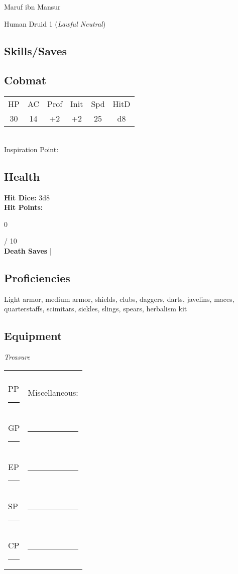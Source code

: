 \documentclass[letterpaper,10pt,twoside,twocolumn,openany]{book}
\begin{document}
{\LARGE{Maruf ibn Mansur}}

Human Druid 1 (\textit{Lawful Neutral})

\subsection{Skills/Saves}
\saves[
    STR=\stat{9},
    DEX=\stat{16},
    CON=\stat{10},
    INT=\stat{10},
    WIS=\stat{16},
    CHA=\stat{15},
]

\subsection{Cobmat}
\begin{tabular}{cccccc}
  HP & AC & Prof & Init & Spd & HitD \\
  30 & 14 & +2   & +2   & 25  & d8   \\
\end{tabular}\\[2pt]
Inspiration Point: \Circle

\subsection{Health}
\begingroup
  \unskip\color{titlered}
  \textbf{Hit Dice:} 3d8 \Circle \Circle \Circle \\
	\textbf{Hit Points:} \parbox[l][1em][c]{1em}{0} / 10 \\
	\textbf{Death Saves} \Circle \Circle \Circle \vspace{1em}|\vspace{1em} \Circle \Circle \Circle \\
\endgroup

\subsection{Proficiencies}
Light armor, medium armor, shields, clubs, daggers, darts, javelins, maces, quarterstaffs, scimitars, sickles, slings, spears, herbalism kit

\subsection{Equipment}


{\Large{\textit{Treasure}}}\\
\begin{tabular}{|ll|}
\hline&\\
PP \rule{.5in}{.2pt} &Miscellaneous:\\
GP \rule{.5in}{.2pt} &\rule{2.2in}{.2pt}\\
EP \rule{.5in}{.2pt} &\rule{2.2in}{.2pt}\\
SP \rule{.5in}{.2pt} &\rule{2.2in}{.2pt}\\
CP \rule{.5in}{.2pt} &\rule{2.2in}{.2pt}\\
\hline
\end{tabular}
\vspace{12pt}
\end{document}
